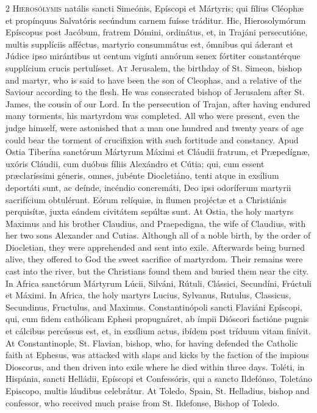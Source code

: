 \begin{paracol}{2}
\lettrine[lines=2]{H}{ierosólymis} natális sancti Simeónis, Epíscopi et Mártyris; qui fílius 
 Cléophæ et propínquus Salvatóris secúndum 
 carnem fuísse tráditur. Hic, Hierosolymórum Epíscopus post Jacóbum, 
 fratrem Dómini, ordinátus, et, in Trajáni persecutióne, multis supplíciis 
 afféctus, martyrio consummátus est, ómnibus qui áderant et Júdice ipso 
 mirántibus ut centum vigínti annórum senex fórtiter constantérque supplícium 
 crucis pertulísset.
\switchcolumn
{}
\lettrine[lines=2]{A}{t} Jerusalem, the birthday of St. Simeon, bishop and martyr, who is said to 
 have been the son of Cleophas, and a relative of the Saviour according to 
 the flesh. He was consecrated bishop of Jerusalem after St. James, the 
 cousin of our Lord. In the persecution of Trajan, after having endured 
 many torments, his martyrdom was completed. All who were present, even 
 the judge himself, were astonished that a man one hundred and twenty years 
 of age could bear the torment of crucifixion with such fortitude and 
 constancy.
\switchcolumn*
{}
Apud Ostia Tiberína sanctórum Mártyrum Máximi et Cláudii fratrum, et Præpedígnæ, 
 uxóris Cláudii, cum duóbus fíliis Alexándro et Cútia; qui, cum essent 
 præclaríssimi géneris, omnes, jubénte Diocletiáno, tenti atque in exsílium 
 deportáti sunt, ac deínde, incéndio concremáti, Deo ipsi odoríferum martyrii 
 sacrifícium obtulérunt. Eórum relíquiæ, in flumen projéctæ et a 
 Christiánis perquisítæ, juxta eándem civitátem sepúltæ sunt.
\switchcolumn
{}
At Ostia, the holy martyrs Maximus and his brother Claudius, and Praepedigna, 
 the wife of Claudius, with her two sons Alexander and Cutias. Although 
 all of a noble birth, by the order of Diocletian, they were apprehended and 
 sent into exile. Afterwards being burned alive, they offered to God 
 the sweet sacrifice of martyrdom. Their remains were cast into the 
 river, but the Christians found them and buried them near the city.
\switchcolumn*
{}
In Africa sanctórum Mártyrum Lúcii, Silváni, Rútuli, 
 Clássici, Secundíni, Frúctuli et Máximi.
\switchcolumn
{}
In Africa, the holy martyrs Lucius, Sylvanus, Rutulus, Classicus, Secundinus, 
 Fructulus, and Maximus.
\switchcolumn*
{}
Constantinópoli sancti Flaviáni Epíscopi, qui, cum fidem cathólicam Ephesi 
 propugnáret, ab ímpii Dióscori factióne pugnis 
 et cálcibus percússus est, et, in exsílium actus, ibídem post tríduum vitam 
 finívit.
\switchcolumn
{}
At Constantinople, St. Flavian, bishop, who, for having defended the 
 Catholic faith at Ephesus, was attacked with slaps and kicks by the faction 
 of the impious Dioscorus, and then driven into exile where he died within 
 three days.
\switchcolumn*
{}
Toléti, in Hispánia, sancti Helládii, Epíscopi et Confessóris, qui a sancto 
 Ildefónso, Toletáno Episcopo, multis láudibus celebrátur.
\switchcolumn
{}
At Toledo, Spain, St. Helladius, bishop and confessor, who received much 
 praise from St. Ildefonse, Bishop of Toledo.
\switchcolumn*
{}
\end{paracol}



